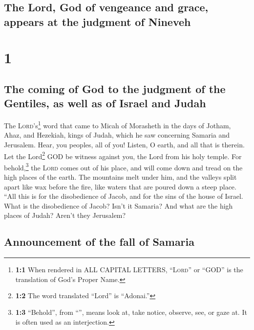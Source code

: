 \hypertarget{the-lord-god-of-vengeance-and-grace-appears-at-the-judgment-of-nineveh}{%
\subsection{The Lord, God of vengeance and grace, appears at the
judgment of
Nineveh}\label{the-lord-god-of-vengeance-and-grace-appears-at-the-judgment-of-nineveh}}

\hypertarget{section}{%
\section{1}\label{section}}

\hypertarget{the-coming-of-god-to-the-judgment-of-the-gentiles-as-well-as-of-israel-and-judah}{%
\subsection{The coming of God to the judgment of the Gentiles, as well
as of Israel and
Judah}\label{the-coming-of-god-to-the-judgment-of-the-gentiles-as-well-as-of-israel-and-judah}}

 The \textsc{Lord}'s\footnote{\textbf{1:1} When rendered
  in ALL CAPITAL LETTERS, ``\textsc{Lord}'' or ``GOD'' is the
  translation of God's Proper Name.} word that came to Micah of
Morasheth in the days of Jotham, Ahaz, and Hezekiah, kings of Judah,
which he saw concerning Samaria and Jerusalem.  Hear, you
peoples, all of you! Listen, O earth, and all that is therein. Let the
Lord\footnote{\textbf{1:2} The word translated ``Lord'' is ``Adonai.''}
GOD be witness against you, the Lord from his holy temple.
 For behold,\footnote{\textbf{1:3} ``Behold'', from
  ``'', means look at, take notice, observe, see, or gaze
  at. It is often used as an interjection.} the \textsc{Lord} comes out
of his place, and will come down and tread on the high places of the
earth.  The mountains melt under him, and the valleys
split apart like wax before the fire, like waters that are poured down a
steep place.  ``All this is for the disobedience of Jacob,
and for the sins of the house of Israel. What is the disobedience of
Jacob? Isn't it Samaria? And what are the high places of Judah? Aren't
they Jerusalem?

\hypertarget{announcement-of-the-fall-of-samaria}{%
\subsection{Announcement of the fall of
Samaria}\label{announcement-of-the-fall-of-samaria}}

